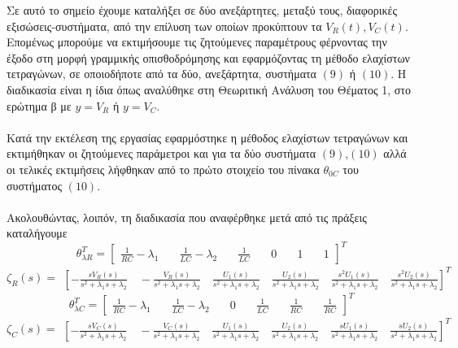 \documentclass[12pt]{article}
\begin{document}
Σε αυτό το σημείο έχουμε καταλήξει σε δύο ανεξάρτητες, μεταξύ τους, διαφορικές εξισώσεις-συστήματα, από την επίλυση των οποίων προκύπτουν τα $V_{R}(t),V_{C}(t)$. Επομένως μπορούμε να εκτιμήσουμε τις ζητούμενες παραμέτρους φέρνοντας την έξοδο στη μορφή γραμμικής οπισθοδρόμησης και εφαρμόζοντας τη μέθοδο ελαχίστων τετραγώνων, σε οποιοδήποτε από τα δύο, ανεξάρτητα, συστήματα $(9)$ ή $(10)$. Η διαδικασία είναι η ίδια όπως αναλύθηκε στη Θεωριτική Ανάλυση του Θέματος 1, στο ερώτημα β με $y=V_{R}$ ή $y=V_{C}$.
\\ \\
Κατά την εκτέλεση της εργασίας εφαρμόστηκε η μέθοδος ελαχίστων τετραγώνων και εκτιμήθηκαν οι ζητούμενες παράμετροι και για τα δύο συστήματα $(9)$,$(10)$ αλλά οι τελικές εκτιμήσεις λήφθηκαν από το πρώτο στοιχείο του πίνακα $\theta_{0C}$ του συστήματος $(10)$.
\\
\\
Ακολουθώντας, λοιπόν, τη διαδικασία που αναφέρθηκε μετά από τις πράξεις καταλήγουμε
\\
\[ \theta^{T}_{ \lambda R}= 
\begin{bmatrix}
		\frac{1}{RC}-\lambda_{1} \quad & \frac{1}{LC}-\lambda_{2} \quad&  \frac{1}{LC} \quad& 0 \quad& 1 \quad & 1 
\end{bmatrix}^{T}
\]
\[ 
\zeta_{R}(s)= 
\begin{matrix} \left[
-\frac{sV_{R}(s)}{s^2+\lambda_{1}s+\lambda_{2}} \quad
-\frac{V_{R}(s)}{s^2+\lambda_{1}s+\lambda_{2}} \quad
\frac{U_{1}(s)}{s^2+\lambda_{1}s+\lambda_{2}} \quad
\frac{U_{2}(s)}{s^2+\lambda_{1}s+\lambda_{2}} \quad
\frac{s^{2} U_{1}(s)}{s^2+\lambda_{1}s+\lambda_{2}} \quad
\frac{s^{2} U_{2}(s)}{s^2+\lambda_{1}s+\lambda_{2}} \right]^{T}
\end{matrix}
\]
\[ \theta^{T}_{ \lambda C}=
\begin{bmatrix}
		\frac{1}{RC}-\lambda_{1} \quad & \frac{1}{LC}-\lambda_{2} \quad & 0 \quad & \frac{1}{LC} \quad & \frac{1}{RC} \quad & \frac{1}{RC}
\end{bmatrix}^{T}
\]
\[ \zeta_{C}(s)=
\begin{matrix} \left[
-\frac{sV_{C}(s)}{s^2+\lambda_{1}s+\lambda_{2}} \quad
-\frac{V_{C}(s)}{s^2+\lambda_{1}s+\lambda_{2}} \quad
\frac{U_{1}(s)}{s^2+\lambda_{1}s+\lambda_{2}} \quad
\frac{U_{2}(s)}{s^2+\lambda_{1}s+\lambda_{2}} \quad
\frac{s U_{1}(s)}{s^2+\lambda_{1}s+\lambda_{2}} \quad
\frac{s U_{2}(s)}{s^2+\lambda_{1}s+\lambda_{2}} \right]^{T}
\end{matrix}\]
\newline
\\ \\
\end{document}
